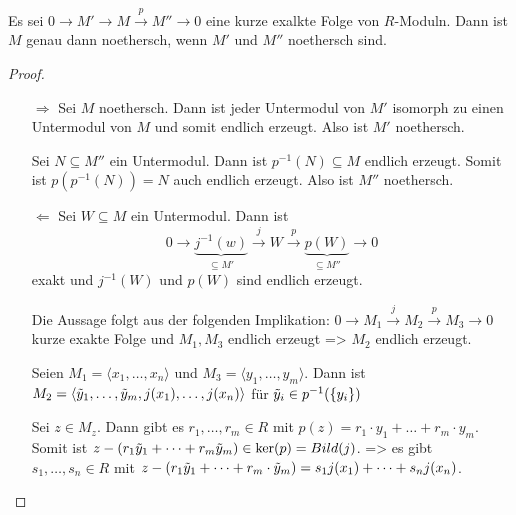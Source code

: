 \documentclass[../main.tex]{subfiles}
\begin{document}
\begin{lemma}
    Es sei $0\rightarrow M'\rightarrow M\overset{p}{\rightarrow }M''\rightarrow 0$ eine kurze exalkte Folge von $R$-Moduln.
    Dann ist $M$ genau dann noethersch, wenn $M'$ und $M''$ noethersch sind.
\end{lemma}
\begin{proof} $ $
    \begin{itemize}
        \item[$\Rightarrow$]
        Sei $M$ noethersch.
        Dann ist jeder Untermodul von $M'$ isomorph zu einen Untermodul von $M$ und somit endlich erzeugt.
        Also ist $M'$ noethersch.

        Sei $N\subseteq M''$ ein Untermodul.
        Dann ist $p^{-1}(N)\subseteq M$ endlich erzeugt.
        Somit ist $p(p^{-1}(N)) = N$ auch endlich erzeugt. Also ist $M''$ noethersch.

        \item[$\Leftarrow$]
        Sei $W\subseteq M$ ein Untermodul.
        Dann ist
        $$0\rightarrow \underbrace{j^{-1}(w)}_{\subseteq M'}\overset{j}{\rightarrow} W \overset{p}{\rightarrow} \underbrace{p(W)}_{\subseteq M''}\rightarrow 0$$
        exakt und $j^{-1}(W)$ und $p(W)$ sind endlich erzeugt.

        Die Aussage folgt aus der folgenden Implikation:
        $0\rightarrow M_1 \overset{j}{\rightarrow} M_2 \overset{p}{\rightarrow} M_3 \rightarrow 0$ kurze exakte Folge und $M_1,M_3$ endlich erzeugt => $M_2$ endlich erzeugt.

        Seien $M_1 = \langle x_1,\dots, x_n\rangle$ und $M_3=\langle y_1, \dots, y_m\rangle$.
        Dann ist $M_2 = \langle \Tilde{y}_1,\dots, \Tilde{y}_m, j(x_1),\dots,j(x_n)\rangle$ für $\Tilde{y}_i\in p^{-1}(\{y_i\})$

        Sei $z\in M_z$. Dann gibt es $r_1,\dots,r_m\in R$ mit $p(z) = r_1\cdot y_1+ \dots + r_m\cdot y_m$.
        Somit ist $z-(r_1\Tilde{y}_1 + \dots + r_m \Tilde{y}_m)\in\ker (p) = Bild(j)$.
        => es gibt $s_1,\dots, s_n\in R$ mit $z-(r_1\Tilde{y}_1 + \dots +r_m\cdot \Tilde{y}_m) = s_1 j(x_1) + \dots + s_n j(x_n)$.
    \end{itemize}
\end{proof}
\end{document}
